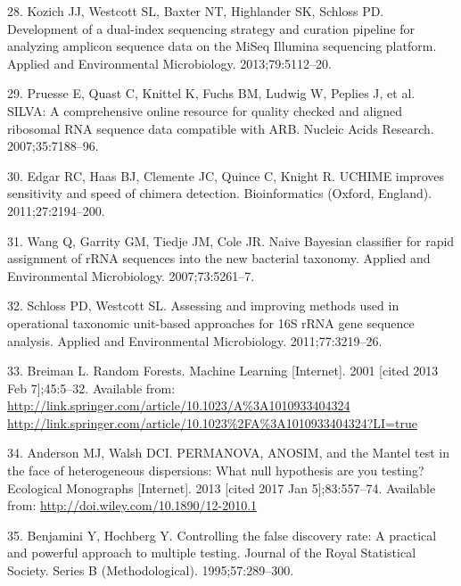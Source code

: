 \documentclass[12pt,]{article}
\begin{document}
\hypertarget{ref-kozich_development_2013}{}
28. Kozich JJ, Westcott SL, Baxter NT, Highlander SK, Schloss PD.
Development of a dual-index sequencing strategy and curation pipeline
for analyzing amplicon sequence data on the MiSeq Illumina sequencing
platform. Applied and Environmental Microbiology. 2013;79:5112--20.

\hypertarget{ref-pruesse_silva_2007}{}
29. Pruesse E, Quast C, Knittel K, Fuchs BM, Ludwig W, Peplies J, et al.
SILVA: A comprehensive online resource for quality checked and aligned
ribosomal RNA sequence data compatible with ARB. Nucleic Acids Research.
2007;35:7188--96.

\hypertarget{ref-edgar_uchime_2011}{}
30. Edgar RC, Haas BJ, Clemente JC, Quince C, Knight R. UCHIME improves
sensitivity and speed of chimera detection. Bioinformatics (Oxford,
England). 2011;27:2194--200.

\hypertarget{ref-wang_naive_2007}{}
31. Wang Q, Garrity GM, Tiedje JM, Cole JR. Naive Bayesian classifier
for rapid assignment of rRNA sequences into the new bacterial taxonomy.
Applied and Environmental Microbiology. 2007;73:5261--7.

\hypertarget{ref-schloss_assessing_2011}{}
32. Schloss PD, Westcott SL. Assessing and improving methods used in
operational taxonomic unit-based approaches for 16S rRNA gene sequence
analysis. Applied and Environmental Microbiology. 2011;77:3219--26.

\hypertarget{ref-breiman_random_2001}{}
33. Breiman L. Random Forests. Machine Learning {[}Internet{]}. 2001
{[}cited 2013 Feb 7{]};45:5--32. Available from:
\href{http://link.springer.com/article/10.1023/A\%3A1010933404324\%20http://link.springer.com/article/10.1023\%2FA\%3A1010933404324?LI=true}{http://link.springer.com/article/10.1023/A\%3A1010933404324 http://link.springer.com/article/10.1023\%2FA\%3A1010933404324?LI=true}

\hypertarget{ref-anderson_permanova_2013}{}
34. Anderson MJ, Walsh DCI. PERMANOVA, ANOSIM, and the Mantel test in
the face of heterogeneous dispersions: What null hypothesis are you
testing? Ecological Monographs {[}Internet{]}. 2013 {[}cited 2017 Jan
5{]};83:557--74. Available from:
\url{http://doi.wiley.com/10.1890/12-2010.1}

\hypertarget{ref-benjamini_controlling_1995}{}
35. Benjamini Y, Hochberg Y. Controlling the false discovery rate: A
practical and powerful approach to multiple testing. Journal of the
Royal Statistical Society. Series B (Methodological). 1995;57:289--300.
\end{document}
